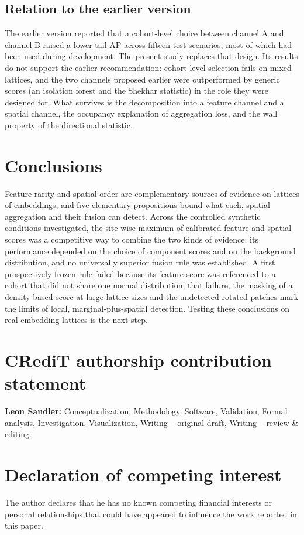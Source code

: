 \documentclass[preprint,review,12pt]{elsarticle}
\begin{document}
\subsection{Relation to the earlier version}
The earlier version reported that a cohort-level choice between channel A and channel B raised a lower-tail AP across fifteen test scenarios, most of which had been used during development. The present study replaces that design. Its results do not support the earlier recommendation: cohort-level selection fails on mixed lattices, and the two channels proposed earlier were outperformed by generic scores (an isolation forest and the Shekhar statistic) in the role they were designed for. What survives is the decomposition into a feature channel and a spatial channel, the occupancy explanation of aggregation loss, and the wall property of the directional statistic.



\section{Conclusions}
Feature rarity and spatial order are complementary sources of evidence on lattices of embeddings, and five elementary propositions bound what each, spatial aggregation and their fusion can detect. Across the controlled synthetic conditions investigated, the site-wise maximum of calibrated feature and spatial scores was a competitive way to combine the two kinds of evidence; its performance depended on the choice of component scores and on the background distribution, and no universally superior fusion rule was established. A first prospectively frozen rule failed because its feature score was referenced to a cohort that did not share one normal distribution; that failure, the masking of a density-based score at large lattice sizes and the undetected rotated patches mark the limits of local, marginal-plus-spatial detection. Testing these conclusions on real embedding lattices is the next step.



\section*{CRediT authorship contribution statement}
\textbf{Leon Sandler:} Conceptualization, Methodology, Software, Validation, Formal analysis, Investigation, Visualization, Writing -- original draft, Writing -- review \& editing.

\section*{Declaration of competing interest}
The author declares that he has no known competing financial interests or personal relationships that could have appeared to influence the work reported in this paper.
\end{document}
